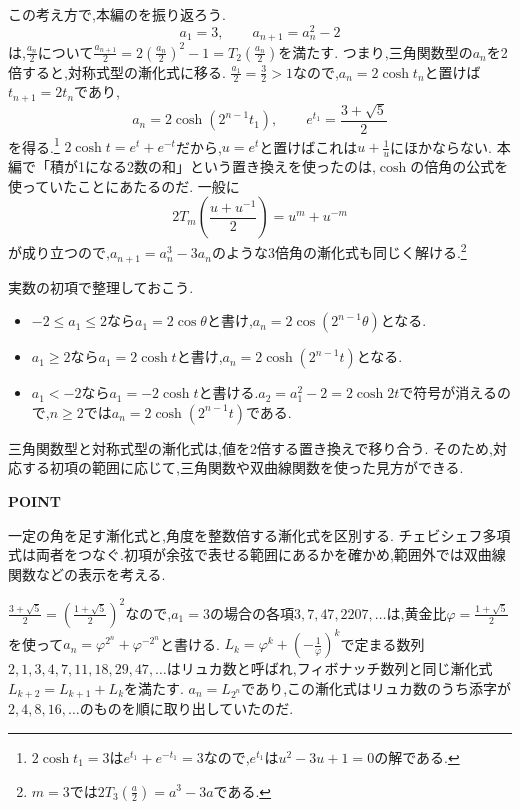 この考え方で,本編のを振り返ろう.
\[
  a_1=3,\qquad a_{n+1}=a_n^2-2
\]
は,$\frac{a_n}{2}$について$\frac{a_{n+1}}{2}=2\left(\frac{a_n}{2}\right)^2-1=T_2\left(\frac{a_n}{2}\right)$を満たす.
つまり,三角関数型の$a_n$を2倍すると,対称式型の漸化式に移る.
$\frac{a_1}{2}=\frac32>1$なので,$a_n=2\cosh t_n$と置けば$t_{n+1}=2t_n$であり,
\[
  a_n=2\cosh\left(2^{n-1}t_1\right),\qquad e^{t_1}=\frac{3+\sqrt5}{2}
\]
を得る.\footnote{$2\cosh t_1=3$は$e^{t_1}+e^{-t_1}=3$なので,$e^{t_1}$は$u^2-3u+1=0$の解である.}
$2\cosh t=e^t+e^{-t}$だから,$u=e^t$と置けばこれは$u+\frac1u$にほかならない.
本編で「積が1になる2数の和」という置き換えを使ったのは,$\cosh$の倍角の公式を使っていたことにあたるのだ.
一般に
\[
  2T_m\left(\frac{u+u^{-1}}{2}\right)=u^m+u^{-m}
\]
が成り立つので,$a_{n+1}=a_n^3-3a_n$のような3倍角の漸化式も同じく解ける.\footnote{$m=3$では$2T_3\left(\frac a2\right)=a^3-3a$である.}

実数の初項で整理しておこう.
\begin{itemize}
  \item $-2\le a_1\le2$なら$a_1=2\cos\theta$と書け,$a_n=2\cos(2^{n-1}\theta)$となる.
  \item $a_1\ge2$なら$a_1=2\cosh t$と書け,$a_n=2\cosh(2^{n-1}t)$となる.
  \item $a_1<-2$なら$a_1=-2\cosh t$と書ける.$a_2=a_1^2-2=2\cosh2t$で符号が消えるので,$n\ge2$では$a_n=2\cosh(2^{n-1}t)$である.
\end{itemize}
三角関数型と対称式型の漸化式は,値を2倍する置き換えで移り合う.
そのため,対応する初項の範囲に応じて,三角関数や双曲線関数を使った見方ができる.

\begin{bookpoint}
  \textbf{POINT}\par
  一定の角を足す漸化式と,角度を整数倍する漸化式を区別する.
  チェビシェフ多項式は両者をつなぐ.初項が余弦で表せる範囲にあるかを確かめ,範囲外では双曲線関数などの表示を考える.
\end{bookpoint}

$\frac{3+\sqrt5}{2}=\left(\frac{1+\sqrt5}{2}\right)^2$なので,$a_1=3$の場合の各項$3,\allowbreak 7,\allowbreak 47,\allowbreak 2207,\allowbreak \ldots$は,黄金比$\varphi=\frac{1+\sqrt5}{2}$を使って$a_n=\varphi^{2^n}+\varphi^{-2^n}$と書ける.
$L_k=\varphi^k+\left(-\frac1\varphi\right)^k$で定まる数列$2,\allowbreak 1,\allowbreak 3,\allowbreak 4,\allowbreak 7,\allowbreak 11,\allowbreak 18,\allowbreak 29,\allowbreak 47,\allowbreak \ldots$はリュカ数と呼ばれ,フィボナッチ数列と同じ漸化式$L_{k+2}=L_{k+1}+L_k$を満たす.
$a_n=L_{2^n}$であり,この漸化式はリュカ数のうち添字が$2,4,8,16,\ldots$のものを順に取り出していたのだ.

